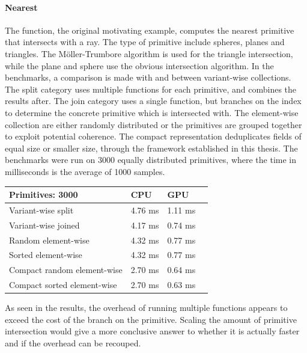 \documentclass{article}
\newcommand{\type}[1]{\smash{\colorbox{codegray}{\texttt{#1}}}}
\begin{document}
\paragraph{Nearest}

The \type{nearest} function, the original motivating example, computes the nearest primitive that intersects with a ray.
The type of primitive include spheres, planes and triangles.
The Möller-Trumbore algorithm is used for the triangle intersection, while the plane and sphere use the obvious intersection algorithm.
In the benchmarks, a comparison is made with and between variant-wise collections.
The split category uses multiple functions for each primitive, and combines the results after.
The join category uses a single function, but branches on the index to determine the concrete primitive which is intersected with.
The element-wise collection are either randomly distributed or the primitives are grouped together to exploit potential coherence.
The compact representation deduplicates fields of equal size or smaller size, through the framework established in this thesis.
The benchmarks were run on 3000 equally distributed primitives, where the time in milliseconds is the average of 1000 samples.

\begin{center}
    \begin{tabular}{ | m{14em} | m{8em}| m{8em} | m{8em} | } 
      \hline
      {\bf Primitives: 3000} & {\bf CPU} & {\bf GPU} \\ 
      \hline
      Variant-wise split          & 4.76 ms & 1.11 ms\\ 
      \hline
      Variant-wise joined         & 4.17 ms & 0.74 ms\\ 
      \hline
      Random element-wise         & 4.32 ms & 0.77 ms\\ 
      \hline
      Sorted element-wise         & 4.32 ms & 0.77 ms\\ 
      \hline
      Compact random element-wise & 2.70 ms & 0.64 ms\\ 
      \hline
      Compact sorted element-wise & 2.70 ms & 0.63 ms\\ 
      \hline
    \end{tabular}
\end{center}

As seen in the results, the overhead of running multiple functions appears to exceed the cost of the branch on the primitive.
Scaling the amount of primitive intersection would give a more conclusive answer to whether it is actually faster and if the overhead can be recouped.  
\end{document}
